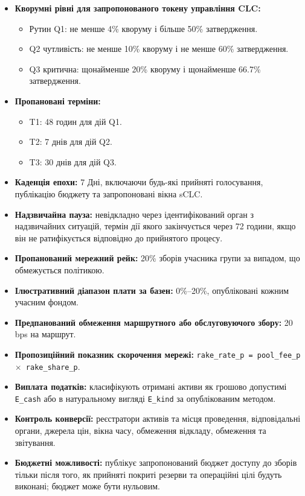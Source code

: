 \documentclass[11pt]{article}
\begin{document}
\begin{itemize}[leftmargin=*]
\item \textbf{Кворумні рівні для запропонованого токену управління CLC:}
\begin{itemize}[leftmargin=*]
\item Рутин Q1: не менше 4\% кворуму і більше 50\% затвердження.
\item Q2 чутливість: не менше 10\% кворуму і не менше 60\% затвердження.
\item Q3 критична: щонайменше 20\% кворуму і щонайменше 66.7\% затвердження.
\end{itemize}
\item \textbf{Пропановані терміни:}
\begin{itemize}[leftmargin=*]
\item T1: 48 годин для дій Q1.
\item T2: 7 днів для дій Q2.
\item T3: 30 днів для дій Q3.
\end{itemize}
\item \textbf{Каденція епохи:} 7 Дні, включаючи будь-які прийняті голосування, публікацію бюджету та запропоновані вікна sCLC.
\item \textbf{Надзвичайна пауза:} невідкладно через ідентифікований орган з надзвичайних ситуацій, термін дії якого закінчується через 72 години, якщо він не ратифікується відповідно до прийнятого процесу.
\item \textbf{Пропанований мережний рейк:} 20\% зборів учасника групи за випадом, що обмежується політикою.
\item \textbf{Ілюстративний діапазон плати за базен:} 0\%--20\%, опубліковані кожним учасним фондом.
\item \textbf{Предпанований обмеження маршрутного або обслуговуючого збору:} 20 bps на маршрут.
\item \textbf{Пропозиційний показник скорочення мережі:} \texttt{rake\_rate\_p = pool\_fee\_p $\times$ rake\_share\_p}.
\item \textbf{Виплата податків:} класифікують отримані активи як грошово допустимі \texttt{E\_cash} або в натуральному вигляді \texttt{E\_kind} за опублікованим методом.
\item \textbf{Контроль конверсії:} реєстратори активів та місця проведення, відповідальні органи, джерела цін, вікна часу, обмеження відкладу, обмеження та звітування.
\item \textbf{Бюджетні можливості:} публікує запропонований бюджет доступу до зборів тільки після того, як прийняті покриті резерви та операційні цілі будуть виконані; бюджет може бути нульовим.

\end{itemize}
\end{document}
